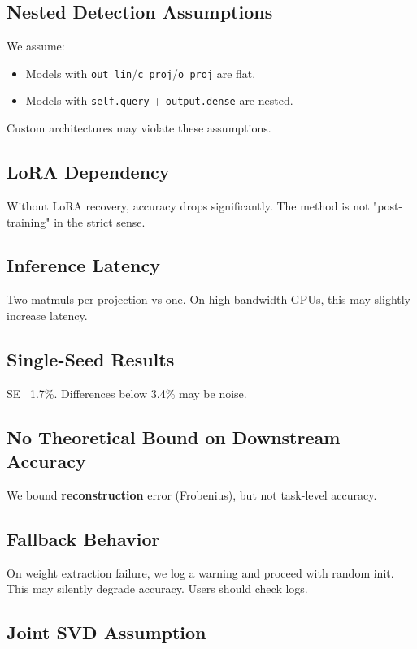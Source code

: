 \subsection{Nested Detection Assumptions}

We assume:
\begin{itemize}
\item Models with \texttt{out\_lin}/\texttt{c\_proj}/\texttt{o\_proj} are flat.
\item Models with \texttt{self.query} + \texttt{output.dense} are nested.

\end{itemize}
Custom architectures may violate these assumptions.

\subsection{LoRA Dependency}

Without LoRA recovery, accuracy drops significantly. The method is not 
"post-training" in the strict sense.

\subsection{Inference Latency}

Two matmuls per projection vs one. On high-bandwidth GPUs, this may 
slightly increase latency.

\subsection{Single-Seed Results}

SE ~1.7\%. Differences below 3.4\% may be noise.

\subsection{No Theoretical Bound on Downstream Accuracy}

We bound \textbf{reconstruction} error (Frobenius), but not task-level accuracy.

\subsection{Fallback Behavior}

On weight extraction failure, we log a warning and proceed with random init. 
This may silently degrade accuracy. Users should check logs.

\subsection{Joint SVD Assumption}

